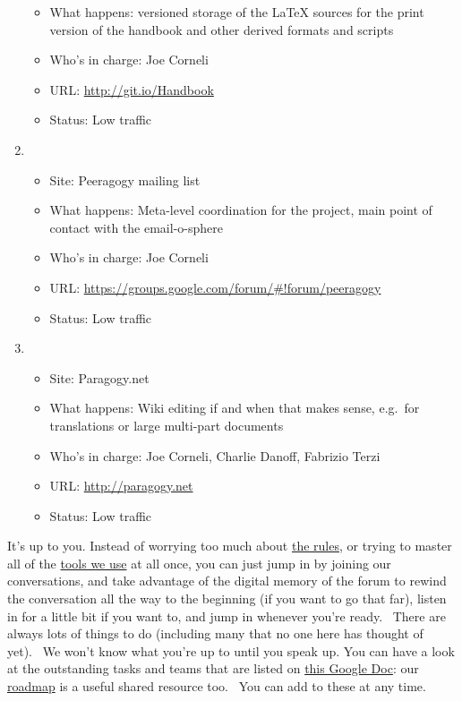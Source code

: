 \begin{enumerate}
\begin{itemize}
  \item
    What happens: versioned storage of the LaTeX sources for the print
    version of the handbook and other derived formats and scripts
  \item
    Who's in charge: Joe Corneli
  \item
    URL: \href{http://git.io/Handbook}{http://git.io/Handbook}
  \item
    Status: Low traffic
  \end{itemize}
\item
  \begin{itemize}
  \itemsep1pt\parskip0pt
  \item
    Site: Peeragogy mailing list
  \item
    What happens: Meta-level coordination for the project, main point of
    contact with the email-o-sphere
  \item
    Who's in charge: Joe Corneli
  \item
    URL:
    \href{https://groups.google.com/forum/\#!forum/peeragogy}{https://groups.google.com/forum/\#!forum/peeragogy}
  \item
    Status: Low traffic
  \end{itemize}
\item
  \begin{itemize}
  \itemsep1pt\parskip0pt
  \item
    Site: Paragogy.net
  \item
    What happens: Wiki editing if and when that makes sense, e.g.~for
    translations or large multi-part documents
  \item
    Who's in charge: Joe Corneli, Charlie Danoff, Fabrizio Terzi
  \item
    URL: \href{http://paragogy.net}{http://paragogy.net}
  \item
    Status: Low traffic
  \end{itemize}
\end{enumerate}

It's up to you. Instead of worrying too much about
\href{http://peeragogy.org/co-working/}{the rules}, or trying to master
all of the \href{http://peeragogy.org/resources/technologies/}{tools we
use} at all once, you can just jump in by joining our conversations, and
take advantage of the digital memory of the forum to rewind the
conversation all the way to the beginning (if you want to go that far),
listen in for a little bit if you want to, and jump in whenever you're
ready.~ There are always lots of things to do (including many that no
one here has thought of yet).~ We won't know what you're up to until you
speak up. You can have a look at the outstanding tasks and teams that
are listed on
\href{https://docs.google.com/document/d/1_2I-z-Pt5NUKk-fpy4jsqxFeXbWS4ao4sIhkxCcRVeI/edit\#}{this
Google Doc}: our
\href{http://peeragogy.org/peeragogy-org-roadmap/}{roadmap} is a useful
shared resource too.~ You can add to these at any time.

